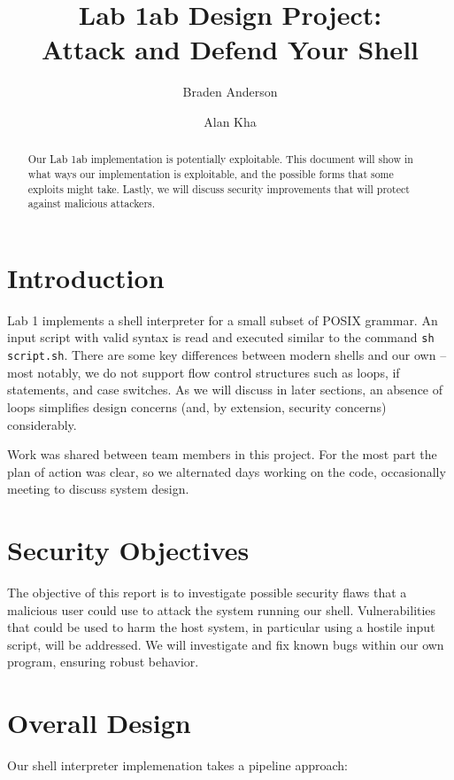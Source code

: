 \documentclass[12pt]{article}
\begin{document}
\lstset{language=C}

\title{Lab 1ab Design Project:\\ Attack and Defend Your Shell}
\author[1]{Braden Anderson}
\author[2]{Alan Kha}

\maketitle

\begin{abstract}
Our Lab 1ab implementation is potentially exploitable. This document will show in what ways our implementation is exploitable, and the possible forms that some exploits might take. Lastly, we will discuss security improvements that will protect against malicious attackers.
\end{abstract}

\section{Introduction}
Lab 1 implements a shell interpreter for a small subset of POSIX grammar. An input script with valid syntax is read and executed similar to the command \texttt{sh script.sh}. There are some key differences between modern shells and our own -- most notably, we do not support flow control structures such as loops, if statements, and case switches. As we will discuss in later sections, an absence of loops simplifies design concerns (and, by extension, security concerns) considerably.

Work was shared between team members in this project. For the most part the plan of action was clear, so we alternated days working on the code, occasionally meeting to discuss system design.

\section{Security Objectives}
The objective of this report is to investigate possible security flaws that a malicious user could use to attack the system running our shell. Vulnerabilities that could be used to harm the host system, in particular using a hostile input script, will be addressed. We will investigate and fix known bugs within our own program, ensuring robust behavior.


\section{Overall Design}
Our shell interpreter implemenation takes a pipeline approach:
\end{document}
